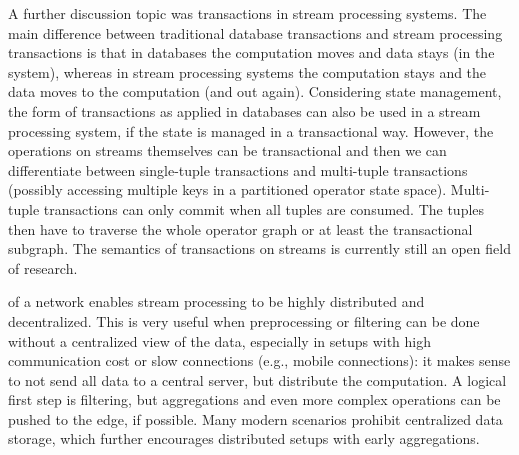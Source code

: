  A further discussion topic was transactions in stream processing systems.
The main difference between traditional database transactions and stream
processing transactions is that in data\-bases the computation moves and
data stays (in the system), whereas in stream processing systems the computation stays
and the data moves to the computation (and out again). Considering state management, the form of transactions as applied in databases
can also be used in a stream processing system, if the state is managed in a
transactional way. However, the operations on streams themselves can be
transactional and then we can differentiate between single-tuple transactions
and multi-tuple transactions (possibly accessing multiple keys in a partitioned operator state space). Multi-tuple transactions can only commit when all tuples are consumed. The tuples then have
to traverse the whole operator graph or at least the transactional subgraph. The semantics of transactions on streams is currently still an open
field of research.

 of a network enables stream processing to
be highly distributed and decentralized. This is very useful when preprocessing
or filtering can be done without a centralized view of the data, especially in
setups with high communication cost or slow connections (e.g., mobile
connections): it makes sense to not send all data to a central server, but
distribute the computation. A logical first step is filtering, but aggregations
and even more complex operations can be pushed to the edge, if possible. Many
modern scenarios prohibit centralized data storage, which further encourages
distributed setups with early aggregations. \iffalse Primary points of research are the
declarativity for specifying highly distributed data processing programs and
the architecture of systems to support these use cases.\fi

\iffalse
\emph{Other topics discussed} were ad hoc queries and graph stream processing.
Most current systems only discuss long running queries, but in many use cases
(e.g., sports, automotive) streams can be short lived as can be stream queries.
\fi 
